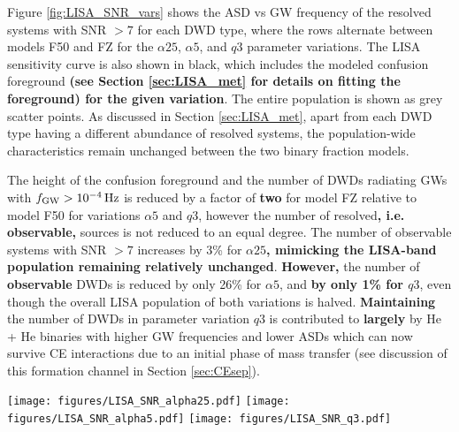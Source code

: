 \documentclass[twocolumn, linenumbers]{aastex631}
\begin{document}
Figure \ref{fig:LISA_SNR_vars} shows the ASD vs GW frequency of the 
resolved systems with SNR $> 7$ for each DWD type, where the rows 
alternate between models F50 and FZ for the $\alpha25$, $\alpha5$, and 
$q3$ parameter variations. The LISA sensitivity curve is also shown in 
black, which includes the modeled confusion foreground \textbf{(see 
Section \ref{sec:LISA_met} for details on fitting the foreground) for the 
given variation}. The entire population is shown as grey scatter points. 
As discussed in Section \ref{sec:LISA_met}, apart from each DWD type 
having a different abundance of resolved systems, the population-wide 
characteristics remain unchanged between the two binary fraction models.

The height of the confusion foreground and the number of DWDs radiating 
GWs with $f_{\rm{GW}} > 10^{-4}\,\rm{Hz}$ is reduced by a factor of 
\textbf{two} for model FZ relative to model F50 for variations $\alpha5$ 
and $q3$, however the number of resolved\textbf{, i.e. observable,} 
sources is not reduced to an equal degree. The number of observable 
systems with SNR $>7$ increases by 3\% for $\alpha25$\textbf{, mimicking 
the LISA-band population remaining relatively unchanged}. \textbf{However, 
}the number of \textbf{observable} DWDs is reduced by only 26\% for 
$\alpha5$, and \textbf{by only 1\% for $q3$}, even though the overall LISA 
population of both variations is halved. \textbf{Maintaining} the number 
of DWDs in parameter variation $q3$ is contributed to \textbf{largely} by 
He + He binaries with higher GW frequencies and lower ASDs which can now 
survive CE interactions due to an initial phase of mass transfer (see 
discussion of this formation channel in Section \ref{sec:CEsep}).

\begin{figure*}[h]
    \centering
	
\texttt{[image: figures/LISA\_SNR\_alpha25.pdf]}
	\texttt{[image: figures/LISA\_SNR\_alpha5.pdf]}
	\texttt{[image: figures/LISA\_SNR\_q3.pdf]}
    \caption{The ASD vs GW frequency for DWDs resolved with SNR $> 7$ for 
each DWD type and parameter variation. The rows alternate between model 
F50 and from model FZ. In each panel, the LISA sensitivity curve, 
including the confusion foreground for each model, is shown in black and 
the total population for each model is shown in grey. Again, we find that 
each model qualitatively exhibits similar characteristics and that the 
only change is in the yield of resolved DWDs for each type based on the 
strength of the confusion foreground.}
    \label{fig:LISA_SNR_vars}

\end{figure*}
\end{document}
